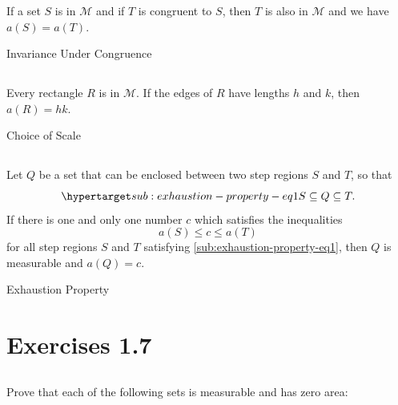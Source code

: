 \documentclass{report}
\begin{document}
  If a set $S$ is in $\mathscr{M}$ and if $T$ is congruent to $S$, then $T$ is
    also in $\mathscr{M}$ and we have $a(S) = a(T)$.

    {Invariance Under Congruence}

\subsection{}%

  Every rectangle $R$ is in $\mathscr{M}$.
  If the edges of $R$ have lengths $h$ and $k$, then $a(R) = hk$.

    {Choice of Scale}

\subsection{}%

  Let $Q$ be a set that can be enclosed between two step regions $S$ and $T$, so
    that
    \begin{equation}
      \hyperlabel{sub:exhaustion-property-eq1}
      S \subseteq Q \subseteq T.
    \end{equation}
  If there is one and only one number $c$ which satisfies the inequalities
    $$a(S) \leq c \leq a(T)$$ for all step regions $S$ and $T$ satisfying
    \eqref{sub:exhaustion-property-eq1}, then $Q$ is measurable and $a(Q) = c$.

    {Exhaustion Property}

\section{Exercises 1.7}%

\subsection{}%

  Prove that each of the following sets is measurable and has zero area:

\subsubsection{}%
\end{document}
